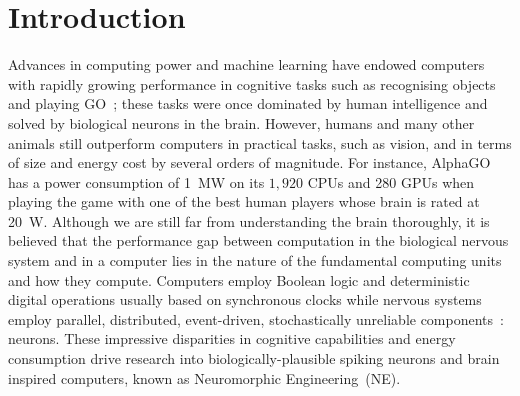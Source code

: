 \chapter{Introduction}
\label{cha:intro}



Advances in computing power and machine learning have endowed computers with rapidly growing performance in cognitive tasks such as recognising objects~\citep{deng2009imagenet} and playing GO~\citep{silver2016mastering};
these tasks were once dominated by human intelligence and solved by biological neurons in the brain.
However, humans and many other animals still outperform computers in practical tasks, such as vision, and in terms of size and energy cost by several orders of magnitude.
For instance, AlphaGO~\citep{silver2016mastering} has a power consumption of 1~MW on its $1,920$ CPUs and 280 GPUs when playing the game with one of the best human players whose brain is rated at 20~W.
Although we are still far from understanding the brain thoroughly, it is believed that the performance gap between computation in the biological nervous system and in a computer lies in the nature of the fundamental computing units and how they compute.
Computers employ Boolean logic and deterministic digital operations usually based on synchronous clocks while nervous systems employ parallel, distributed, event-driven, stochastically unreliable components~\citep{indiveri2009artificial}: neurons.
These impressive disparities in cognitive capabilities and energy consumption drive research into biologically-plausible spiking neurons and brain inspired computers, known as Neuromorphic Engineering~(NE).




